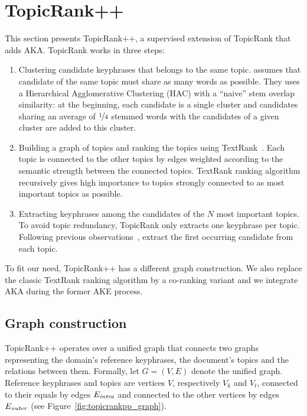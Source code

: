 \section{TopicRank++}
\label{sec:topicrankpp}
  This section presents TopicRank++, a supervised extension of TopicRank that
  adds AKA. Topic\-Rank works in three steps:
  \begin{enumerate}
    \item{Clustering candidate keyphrases that belongs to the same topic.
           assumes that candidate of the same
          topic must share as many words as possible. They uses a Hierarchical
          Agglomerative Clustering (HAC) with a ``naive'' stem overlap
          similarity: at the beginning, each candidate is a single cluster and
          candidates sharing an average of $\unitfrac{1}{4}$ stemmed words with
          the candidates of a given cluster are added to this cluster.}
    \item{Building a graph of topics and ranking the topics using
          TextRank~\cite{mihalcea2004textrank}. Each topic is connected to the
          other topics by edges weighted according to the semantic strength
          between the connected topics. TextRank ranking algorithm recursively
          gives high importance to topics strongly connected to as most
          important topics as possible.}
    \item{Extracting keyphrases among the candidates of the $N$ most important
          topics. To avoid topic redundancy, TopicRank only extracts one
          keyphrase per topic. Following previous
          observations~\cite{witten1999kea}, 
          extract the first occurring candidate from each topic.}
  \end{enumerate}

  To fit our need, TopicRank++ has a different graph construction. We also
  replace the classic TextRank ranking algorithm by a co-ranking variant and
  we integrate AKA during the former AKE process.

  \subsection{Graph construction}
  \label{subsec:graph_construction}
    TopicRank++ operates over a unified graph that connects two graphs
    representing the domain's reference keyphrases, the document's topics and
    the relations between them. Formally, let $G = (V, E)$ denote the unified
    graph. Reference keyphrases and topics are vertices $V$, respectively $V_k$
    and $V_t$, connected to their equals by edges
    $E_\textnormal{\textit{intra}}$ and connected to the other vertices by edges
    $E_\textnormal{\textit{outer}}$ (see Figure~\ref{fig:topicrankpp_graph}).

